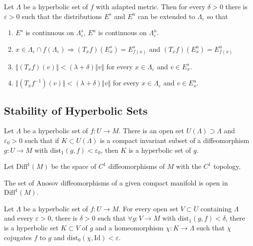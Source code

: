 \begin{prop}

Let $\Lambda$ be a hyperbolic set of $f$ with adapted metric. Then for every $\delta > 0$ there is $\varepsilon > 0$ such that the distributions $E^s$ and $E^u$ can be extended to $\Lambda_{\varepsilon}$ so that 
\begin{enumerate}
    \item $E^s$ is continuous on $\Lambda^s_{\varepsilon}$, $E^u$ is continuous on $\Lambda^u_{\varepsilon}$.
    \item $x \in \Lambda_{\varepsilon} \cap f(\Lambda_{\varepsilon}) \Rightarrow (T_xf)(E^s_x)=E^s_{f(x)}$ and $(T_xf)(E^u_x) = E^u_{f(x)}$
    \item $\Vert (T_xf)(v) \Vert < (\lambda + \delta) \Vert v \Vert $ for every $x \in \Lambda_{\varepsilon}$ and $v \in E^s_x$.
    \item $\Vert (T_xf^{-1})(v) \Vert < (\lambda + \delta) \Vert v \Vert$ for every $x \in \Lambda_{\varepsilon}$ and $v \in E^u_x$.
\end{enumerate}

\end{prop}

\subsection{Stability of Hyperbolic Sets}

\begin{prop}

Let $\Lambda$ be a hyperbolic set of $f: U \to M$. There is an open set $U(\Lambda) \supset \Lambda$ and $\varepsilon_0 > 0$ such that if $K \subset U(\Lambda)$ is a compact invariant subset of a diffeomorphism $g:U \to M$ with $\mathrm{dist}_1(g,f) < \varepsilon_0$, then $K$ is a hyperbolic set of $g$.

\end{prop}

Let $\mathrm{Diff}^1(M)$ be the space of $C^1$ diffeomorphisms of $M$ with the $C^1$ topology.

\begin{cor}

The set of Anosov diffeomorphisms of a given compact manifold is open in $\mathrm{Diff}^1(M)$.

\end{cor}

\begin{prop}

Let $\Lambda$ be a hyperbolic set of $f:U \to M$. For every open set $V \subset U$ containing $\Lambda$ and every $\varepsilon > 0$, there is $\delta > 0$ such that $\forall g: V \to M$ with $\mathrm{dist}_1(g,f) < \delta$, there is a hyperbolic set $K \subset V$ of $g$ and a homeomorphism $\chi: K \to \Lambda$ such that $\chi$ cojugates $f$ to $g$ and $\mathrm{dist}_0(\chi, \mathrm{Id}) < \varepsilon$.
\end{prop}

